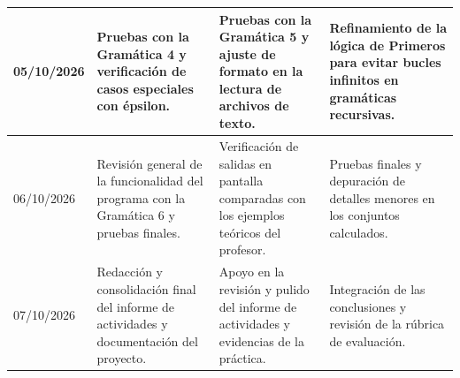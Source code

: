 \begin{longtable}{|P{2cm}|P{4.4cm}|P{4.4cm}|P{4.4cm}|}
05/10/2026 &
  Pruebas con la Gramática 4 y verificación de casos especiales con épsilon. &
  Pruebas con la Gramática 5 y ajuste de formato en la lectura de archivos de texto. &
  Refinamiento de la lógica de Primeros para evitar bucles infinitos en gramáticas
  recursivas. \\[4pt]
\hline

06/10/2026 &
  Revisión general de la funcionalidad del programa con la Gramática 6 y pruebas finales. &
  Verificación de salidas en pantalla comparadas con los ejemplos teóricos del profesor. &
  Pruebas finales y depuración de detalles menores en los conjuntos calculados. \\[4pt]
\hline

07/10/2026 &
  Redacción y consolidación final del informe de actividades y documentación del proyecto. &
  Apoyo en la revisión y pulido del informe de actividades y evidencias de la práctica. &
  Integración de las conclusiones y revisión de la rúbrica de evaluación. \\[4pt]
\hline

\end{longtable}

